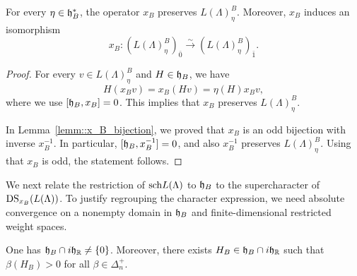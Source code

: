 \begin{lemma}\label{lemm::identify_restricted_weight_spaces}
For every $\eta\in{\mathfrak h}_B^\ast$, the operator $x_B$ preserves $L(\Lambda)_{\eta}^{B}$. Moreover, $x_{B}$ induces an isomorphism
\[
x_B:(L(\Lambda)_{\eta}^{B})_{\bar0}
\xrightarrow{\sim}
(L(\Lambda)_{\eta}^{B})_{\bar1}.
\]
\end{lemma}

\begin{proof}
For every $v\in L(\Lambda)_{\eta}^{B}$ and $H\in{\mathfrak h}_B$, we have
\[
H(x_Bv)=x_B(Hv)=\eta(H)x_Bv,
\]
where we use $[{\mathfrak h}_{B},x_{B}]=0$. This implies that $x_B$ preserves $L(\Lambda)_{\eta}^{B}$.

In Lemma~\ref{lemm::x_B_bijection}, we proved that $x_{B}$ is an odd bijection with inverse $x_{B}^{-1}$. In particular, $[{\mathfrak h}_B,x_{B}^{-1}]=0$, and also $x_{B}^{-1}$ preserves $L(\Lambda)^{B}_{\eta}$. Using that $x_{B}$ is odd, the statement follows.
\end{proof}

We next relate the restriction of ${\operatorname{sch}} L(\Lambda)$ to ${\mathfrak h}_B$
to the supercharacter of $\operatorname{DS}_{x_B}(L(\Lambda))$.
To justify regrouping the character expression, we need absolute
convergence on a nonempty domain in ${\mathfrak h}_B$ and finite-dimensional
restricted weight spaces.

\begin{lemma}\label{lemm::Gordan}
One has ${\mathfrak h}_B\cap i{\mathfrak h}_{{\mathbb R}}\neq \{0\}$. Moreover, there exists
$
H_B\in{\mathfrak h}_B\cap i{\mathfrak h}_{{\mathbb R}}
$ such that $\beta(H_B)>0$ for all
$\beta\in\Delta_n^+$.
\end{lemma}


